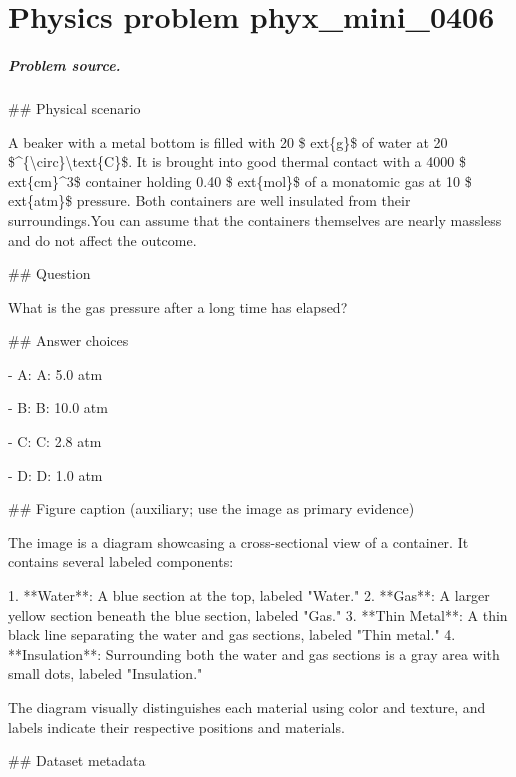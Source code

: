 
\chapter{Physics problem phyx\_mini\_0406}
\label{ch:PhyXMiniProblems_problem_phyx_mini_0406}

\paragraph{Problem source.}
\#\# Physical scenario

A beaker with a metal bottom is filled with 20 \$	ext\{g\}\$ of water at 20 \$\textasciicircum{}\{\textbackslash{}circ\}\textbackslash{}text\{C\}\$. It is brought into good thermal contact with a 4000 \$	ext\{cm\}\textasciicircum{}3\$ container holding 0.40 \$	ext\{mol\}\$ of a monatomic gas at 10 \$	ext\{atm\}\$ pressure. Both containers are well insulated from their surroundings.You can assume that the containers themselves are nearly massless and do not affect the outcome.

\#\# Question

What is the gas pressure after a long time has elapsed?

\#\# Answer choices

- A: A: 5.0 atm

- B: B: 10.0 atm

- C: C: 2.8 atm

- D: D: 1.0 atm

\#\# Figure caption (auxiliary; use the image as primary evidence)

The image is a diagram showcasing a cross-sectional view of a container. It contains several labeled components:

1. **Water**: A blue section at the top, labeled "Water."
2. **Gas**: A larger yellow section beneath the blue section, labeled "Gas."
3. **Thin Metal**: A thin black line separating the water and gas sections, labeled "Thin metal."
4. **Insulation**: Surrounding both the water and gas sections is a gray area with small dots, labeled "Insulation."

The diagram visually distinguishes each material using color and texture, and labels indicate their respective positions and materials.

\#\# Dataset metadata

